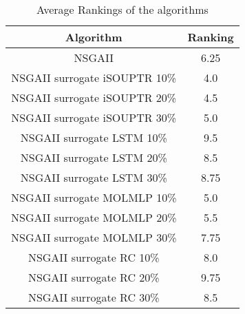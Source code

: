 
\begin{table}[!htp]
\centering
\caption{Average Rankings of the algorithms
}\begin{tabular}{c|c}
Algorithm&Ranking\\
\hline
NSGAII&6.25\\
NSGAII surrogate iSOUPTR 10\%&4.0\\
NSGAII surrogate iSOUPTR 20\%&4.5\\
NSGAII surrogate iSOUPTR 30\%&5.0\\
NSGAII surrogate LSTM 10\%&9.5\\
NSGAII surrogate LSTM 20\%&8.5\\
NSGAII surrogate LSTM 30\%&8.75\\
NSGAII surrogate MOLMLP 10\%&5.0\\
NSGAII surrogate MOLMLP 20\%&5.5\\
NSGAII surrogate MOLMLP 30\%&7.75\\
NSGAII surrogate RC 10\%&8.0\\
NSGAII surrogate RC 20\%&9.75\\
NSGAII surrogate RC 30\%&8.5\\
\end{tabular}
\end{table}